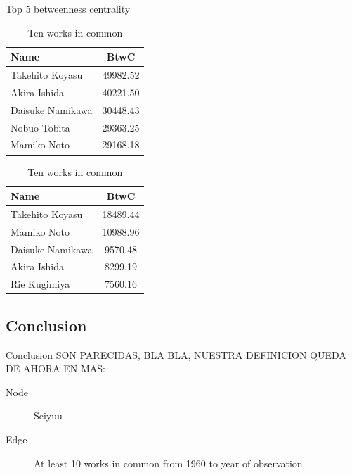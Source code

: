 \begin{frame}{Top 5 betweenness centrality}
\begin{table}[!htb]
    \begin{minipage}{.5\textwidth}
        \centering
            \begin{tabular}{|l|c|}
				\hline
				Name & BtwC \\
				\hline
				Takehito Koyasu & 49982.52 \\
				\hline
				Akira Ishida & 40221.50 \\
				\hline
				Daisuke Namikawa & 30448.43 \\
				\hline
				Nobuo Tobita & 29363.25 \\
				\hline
				Mamiko Noto & 29168.18 \\
				\hline
		\end{tabular}
        \caption{One work in common}
    \end{minipage}%
    \begin{minipage}{.5\textwidth}
        \centering
        \begin{tabular}{|l|c|}
				\hline
				Name & BtwC \\
				\hline
				Takehito Koyasu & 18489.44 \\
				\hline
				Mamiko Noto & 10988.96 \\
				\hline
				Daisuke Namikawa & 9570.48 \\
				\hline
				Akira Ishida & 8299.19 \\
				\hline
				Rie Kugimiya & 7560.16 \\
				\hline
		\end{tabular}
        \caption{Ten works in common}
    \end{minipage}
\end{table}
\end{frame}

\subsection{Conclusion}
\begin{frame}{Conclusion}
SON PARECIDAS, BLA BLA, NUESTRA DEFINICION QUEDA DE AHORA EN MAS:
\begin{description}
\item[Node] Seiyuu
\item[Edge] At least 10 works in common from 1960 to year of observation.
\end{description}
\end{frame}
